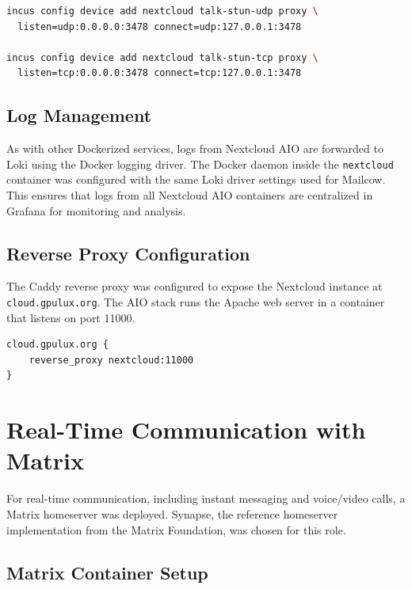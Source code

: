 \begin{lstlisting}[language=bash,caption={Forwarding ports for Nextcloud Talk.}]
incus config device add nextcloud talk-stun-udp proxy \
  listen=udp:0.0.0.0:3478 connect=udp:127.0.0.1:3478

incus config device add nextcloud talk-stun-tcp proxy \
  listen=tcp:0.0.0.0:3478 connect=tcp:127.0.0.1:3478
\end{lstlisting}

\subsection*{Log Management}

As with other Dockerized services, logs from Nextcloud AIO are forwarded to Loki using the Docker logging driver. The Docker daemon inside the \texttt{nextcloud} container was configured with the same Loki driver settings used for Mailcow. This ensures that logs from all Nextcloud AIO containers are centralized in Grafana for monitoring and analysis.

\subsection*{Reverse Proxy Configuration}

The Caddy reverse proxy was configured to expose the Nextcloud instance at \texttt{cloud.gpulux.org}. The AIO stack runs the Apache web server in a container that listens on port 11000.

\begin{lstlisting}[caption={Caddyfile configuration to reverse proxy Nextcloud.}]
cloud.gpulux.org {
    reverse_proxy nextcloud:11000
}
\end{lstlisting}

\section{Real-Time Communication with Matrix}

For real-time communication, including instant messaging and voice/video calls, a Matrix\cite{matrix-docs} homeserver was deployed. Synapse, the reference homeserver implementation from the Matrix Foundation, was chosen for this role.

\subsection*{Matrix Container Setup}

